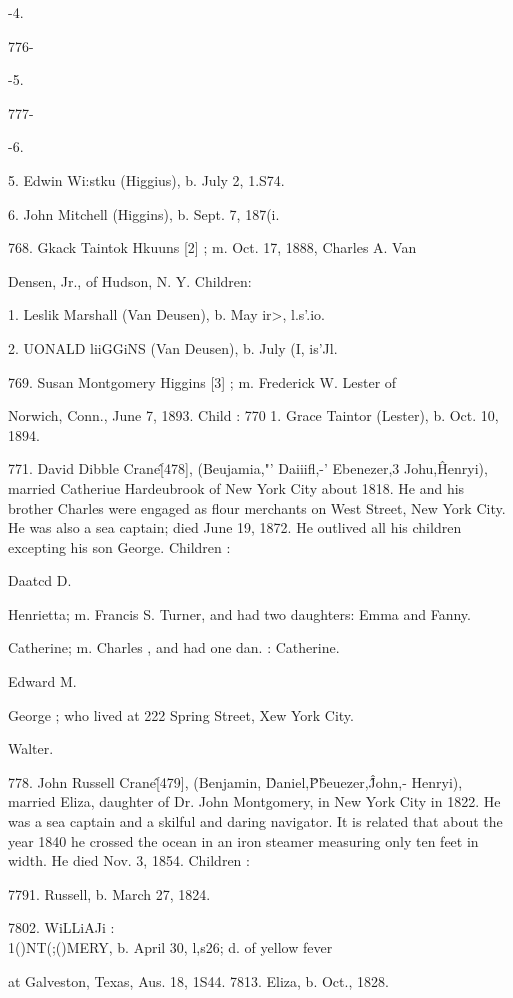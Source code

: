 -4. 


776- 


-5. 


777- 


-6. 




5. Edwin Wi:stku (Higgius), b. July 2, 1.S74. 

6. John Mitchell (Higgins), b. Sept. 7, 187(i. 

768. Gkack Taintok Hkuuns [2] ; m. Oct. 17, 1888, Charles A. Van 

Densen, Jr., of Hudson, N. Y. Children: 

1. Leslik Marshall (Van Deusen), b. May ir>, l.s'.io. 

2. UONALD liiGGiNS (Van Deusen), b. July (I, is'Jl. 

769. Susan Montgomery Higgins [3] ; m. Frederick W. Lester of 

Norwich, Conn., June 7, 1893. Child : 
770 1. Grace Taintor (Lester), b. Oct. 10, 1894. 

771. David Dibble Crane\^ [478], (Beujamia,"' Daiiifl,-' 
Ebenezer,3 Johu,\^ Henryi), married Catheriue Hardeubrook of 
New York City about 1818. He and his brother Charles were 
engaged as flour merchants on West Street, New York City. He 
was also a sea captain; died June 19, 1872. He outlived all his 
children excepting his son George. Children : 

Daatcd D. 

Henrietta; m. Francis S. Turner, and had two daughters: 
Emma and Fanny. 

Catherine; m. Charles , and had one dan. : Catherine. 

Edward M. 

George ; who lived at 222 Spring Street, Xew York City. 

Walter. 

778. John Russell Crane\^ [479], (Benjamin, \^ Daniel,\^ 
P\^beuezer,\^\^ John,- Henryi), married Eliza, daughter of Dr. John 
Montgomery, in New York City in 1822. He was a sea captain 
and a skilful and daring navigator. It is related that about the 
year 1840 he crossed the ocean in an iron steamer measuring only 
ten feet in width. He died Nov. 3, 1854. Children : 

7791. Russell, b. March 27, 1824. 

7802. WiLLiAJi :\\1()NT(;()MERY, b. April 30, l,s26; d. of yellow fever 

at Galveston, Texas, Aus. 18, 1S44. 
7813. Eliza, b. Oct., 1828. 

